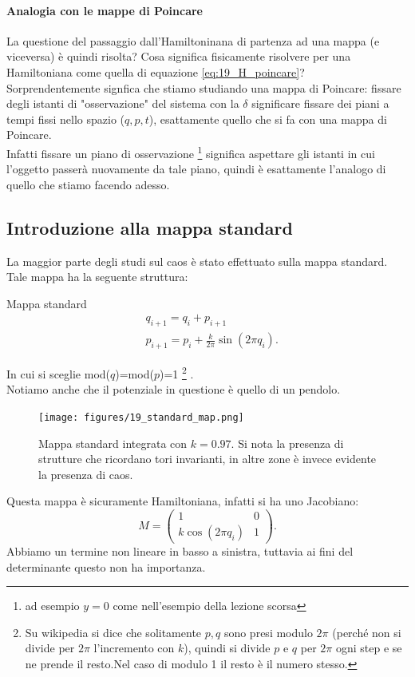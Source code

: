 \paragraph{Analogia con le mappe di Poincare}%
\label{par:Analogia con le mappe di Poincare}
La questione del passaggio dall'Hamiltoninana di partenza ad una mappa (e viceversa) è quindi risolta? Cosa significa fisicamente risolvere per una Hamiltoniana come quella di equazione \ref{eq:19_H_poincare}?\\
Sorprendentemente signfica che stiamo studiando una mappa di Poincare: fissare degli istanti di "osservazione" del sistema con la $\delta$ significare fissare dei piani a tempi fissi nello spazio ($q,p,t$), esattamente quello che si fa con una mappa di Poincare.\\
Infatti fissare un piano di osservazione
\footnote{ad esempio $y=0$ come nell'esempio della lezione scorsa}
significa aspettare gli istanti in cui l'oggetto passerà nuovamente da tale piano, quindi è esattamente l'analogo di quello che stiamo facendo adesso.
\subsection{Introduzione alla mappa standard}%
\label{sub:Introduzione alla mappa standard}
La maggior parte degli studi sul caos è stato effettuato sulla mappa standard. Tale mappa ha la seguente struttura:
\begin{redbox}{Mappa standard}
 \[\begin{aligned}
    & q_{i+1} = q_i + p_{i+1}\\
    & p_{i+1} = p_i + \frac{k}{2\pi}\sin (2\pi q_i)
.\end{aligned}\]   
\end{redbox}
\noindent
In cui si sceglie mod($q$)=mod($p$)=1
\footnote{Su wikipedia si dice che solitamente $p, q$ sono presi modulo $2\pi$ (perché non si divide per $2\pi$ l'incremento con $k$), quindi si divide $p$ e $q$ per $2\pi$ ogni step e se ne prende il resto.Nel caso di modulo 1 il resto è il numero stesso.}
.\\
Notiamo anche che il potenziale in questione è quello di un pendolo.
\begin{figure}[H]
    \centering
    \texttt{[image: figures/19\_standard\_map.png]}
    \caption{\scriptsize Mappa standard integrata con $k=0.97$. Si nota la presenza di strutture che ricordano tori invarianti, in altre zone è invece evidente la presenza di caos.}
    \label{fig:figures-19_standard_map-png}
\end{figure}
\noindent
Questa mappa è sicuramente Hamiltoniana, infatti si ha uno Jacobiano:
\[
     M = 
     \begin{pmatrix}
	 1 & 0 \\
	 k \cos(2\pi q_i) & 1
     \end{pmatrix} 
.\] 
Abbiamo un termine non lineare in basso a sinistra, tuttavia ai fini del determinante questo non ha importanza.
